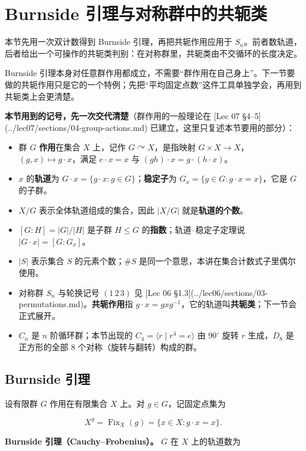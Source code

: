 \section{Burnside 引理与对称群中的共轭类}


本节先用一次双计数得到 Burnside 引理，再把共轭作用应用于 $S_n$。前者数轨道，后者给出一个可操作的共轭类判别：在对称群里，共轭类由不交循环的长度决定。

Burnside 引理本身对任意群作用都成立，不需要“群作用在自己身上”。下一节要做的共轭作用只是它的一个特例；先把“平均固定点数”这件工具单独学会，再用到共轭类上会更清楚。

\textbf{本节用到的记号，先一次交代清楚}（群作用的一般理论在 [Lec 07 §4–5](../lec07/sections/04-group-actions.md) 已建立，这里只复述本节要用的部分）：

\begin{itemize}
\item 群 $G$ \textbf{作用}在集合 $X$ 上，记作 $G\curvearrowright X$，是指映射 $G\times X\to X$，$(g,x)\mapsto g\cdot x$，满足 $e\cdot x=x$ 与 $(gh)\cdot x=g\cdot(h\cdot x)$。
\item $x$ 的\textbf{轨道}为 $G\cdot x=\{g\cdot x:g\in G\}$；\textbf{稳定子}为 $G_x=\{g\in G:g\cdot x=x\}$，它是 $G$ 的子群。
\item $X/G$ 表示全体轨道组成的集合，因此 $|X/G|$ 就是\textbf{轨道的个数}。
\item $[G:H]=|G|/|H|$ 是子群 $H\le G$ 的\textbf{指数}；轨道--稳定子定理说 $|G\cdot x|=[G:G_x]$。
\item $|S|$ 表示集合 $S$ 的元素个数；$\#S$ 是同一个意思，本讲在集合计数式子里偶尔使用。
\item 对称群 $S_n$ 与轮换记号 $(1\,2\,3)$ 见 [Lec 06 §1.3](../lec06/sections/03-permutations.md)。\textbf{共轭作用}指 $g\cdot x=gxg^{-1}$，它的轨道叫\textbf{共轭类}；下一节会正式展开。
\item $C_n$ 是 $n$ 阶循环群；本节出现的 $C_4=\langle r\mid r^4=e\rangle$ 由 $90^\circ$ 旋转 $r$ 生成，$D_8$ 是正方形的全部 8 个对称（旋转与翻转）构成的群。
\end{itemize}


\subsection{Burnside 引理}


设有限群 $G$ 作用在有限集合 $X$ 上。对 $g\in G$，记固定点集为

\[
X^g=\operatorname{Fix}_X(g)=\{x\in X:g\cdot x=x\}.
\]

\textbf{Burnside 引理（Cauchy--Frobenius）。} $G$ 在 $X$ 上的轨道数为

